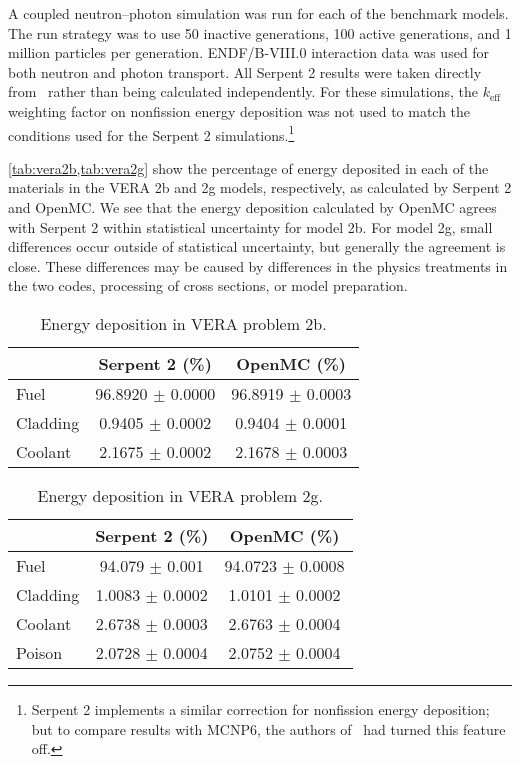 \documentclass{anstrans}
\begin{document}
A coupled neutron--photon simulation was run for each of the benchmark models.
The run strategy was to use 50 inactive generations, 100 active generations, and
1 million particles per generation. ENDF/B-VIII.0 interaction data was used for
both neutron and photon transport. All Serpent 2 results were taken directly
from~\cite{tuominen2019ane} rather than being calculated independently. For
these simulations, the $k_\text{eff}$ weighting factor on nonfission energy
deposition was not used to match the conditions used for the Serpent 2
simulations.\!\footnote{Serpent 2 implements a similar correction for
nonfission energy deposition; but to compare results with MCNP6, the authors
of~\cite{tuominen2019ane} had turned this feature off.}

\cref{tab:vera2b,tab:vera2g} show the percentage of energy deposited in each of
the materials in the VERA 2b and 2g models, respectively, as calculated by
Serpent 2 and OpenMC. We see that the energy deposition calculated by OpenMC
agrees with Serpent 2 within statistical uncertainty for model 2b. For model 2g,
small differences occur  outside of statistical uncertainty, but generally
the agreement is close. These differences may be caused by differences in
the physics treatments in the two codes, processing of cross sections, or model
preparation.
\begin{table}[H]
  \centering
  \caption{Energy deposition in VERA problem 2b.}
  \label{tab:vera2b}
  \begin{tabular}{lcc}
    \toprule
    & Serpent 2 (\%) & OpenMC (\%) \\
    \midrule
    Fuel & 96.8920 $\pm$ 0.0000 & 96.8919 $\pm$ 0.0003 \\
    Cladding & 0.9405 $\pm$ 0.0002 & 0.9404 $\pm$ 0.0001 \\
    Coolant & 2.1675 $\pm$ 0.0002 & 2.1678 $\pm$ 0.0003 \\
    \bottomrule
  \end{tabular}
\end{table}

\begin{table}[H]
  \centering
  \caption{Energy deposition in VERA problem 2g.}
  \label{tab:vera2g}
  \begin{tabular}{lcc}
    \toprule
    & Serpent 2 (\%) & OpenMC (\%) \\
    \midrule
    Fuel & 94.079 $\pm$ 0.001 & 94.0723 $\pm$ 0.0008 \\
    Cladding & 1.0083 $\pm$ 0.0002 & 1.0101 $\pm$ 0.0002 \\
    Coolant & 2.6738 $\pm$ 0.0003 & 2.6763 $\pm$ 0.0004 \\
    Poison & 2.0728 $\pm$ 0.0004 & 2.0752 $\pm$ 0.0004 \\
    \bottomrule
  \end{tabular}
\end{table}
\end{document}
